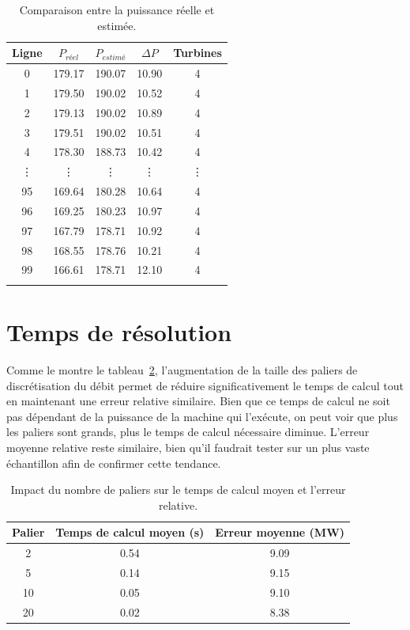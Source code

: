 \documentclass[12pt, letterpaper]{report}
\begin{document}
\begin{table}[h]
\caption{Comparaison entre la puissance réelle et estimée.}
\centering
\begin{tabular}{ccccc}
\toprule
Ligne & $P_{réel}$ & $P_{estimé}$ & $\Delta P$ & Turbines \\
\midrule
0 & 179.17 & 190.07 & 10.90 & 4 \\
1 & 179.50 & 190.02 & 10.52 & 4 \\
2 & 179.13 & 190.02 & 10.89 & 4 \\
3 & 179.51 & 190.02 & 10.51 & 4 \\
4 & 178.30 & 188.73 & 10.42 & 4 \\
\vdots & \vdots & \vdots & \vdots & \vdots \\
95 & 169.64 & 180.28 & 10.64 & 4 \\
96 & 169.25 & 180.23 & 10.97 & 4 \\
97 & 167.79 & 178.71 & 10.92 & 4 \\
98 & 168.55 & 178.76 & 10.21 & 4 \\
99 & 166.61 & 178.71 & 12.10 & 4 \\
\bottomrule
\label{tab:resultats}
\end{tabular}
\end{table}

\section{Temps de résolution}
Comme le montre le tableau~\ref{tab:impact_paliers}, l'augmentation de la taille des paliers de discrétisation du débit permet de réduire significativement le temps de calcul tout en maintenant une erreur relative similaire.  Bien que ce temps de calcul ne soit pas dépendant de la puissance de la machine qui l'exécute, on peut voir que plus les paliers sont grands, plus le temps de calcul nécessaire diminue.  L'erreur moyenne relative reste similaire, bien qu'il faudrait tester sur un plus vaste échantillon afin de confirmer cette tendance.

\begin{table}[h]
\centering
\caption{Impact du nombre de paliers sur le temps de calcul moyen et l'erreur relative.}
\begin{tabular}{ccc}
\toprule
Palier & Temps de calcul moyen (s) & Erreur moyenne (MW) \\
\midrule
2  & 0.54 & 9.09 \\
5  & 0.14 & 9.15 \\
10 & 0.05 & 9.10 \\
20 & 0.02 & 8.38 \\
\bottomrule
\end{tabular}
\label{tab:impact_paliers}
\end{table}
\end{document}
